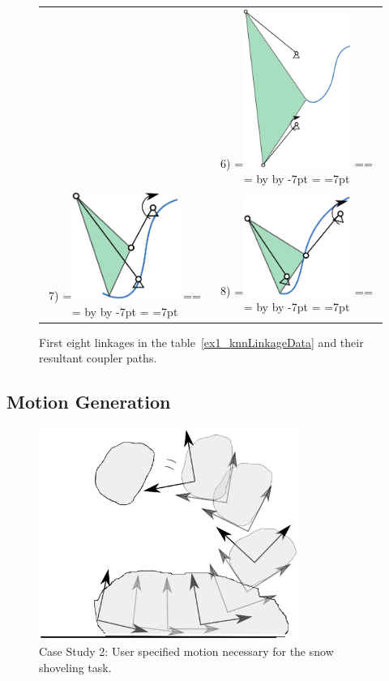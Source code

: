\documentclass[twocolumn,10pt]{asme2ej}
\makeatletter
\newcommand{\putindeepbox}[2][0.7\baselineskip]{{%
    \setbox0=\hbox{#2}%
    \setbox0=\vbox{\noindent\hsize=\wd0\unhbox0}
    \@tempdima=\dp0
    \advance\@tempdima by \ht0
    \advance\@tempdima by -#1\relax
    \dp0=\@tempdima
    \ht0=#1\relax
    \box0
}}
\makeatother
\begin{document}
\begin{figure}
\begin{tabular}{cc}
    & 6)\putindeepbox[7pt]{\includegraphics[width=100pt]{figure/path_solutions/path_sol6.eps}} \\
  7)\putindeepbox[7pt]{\includegraphics[width=100pt]{figure/path_solutions/path_sol7.eps}}
    & 8)\putindeepbox[7pt]{\includegraphics[width=100pt]{figure/path_solutions/path_sol8.eps}}\\
\end{tabular}
\caption{First eight linkages in the table~\ref{ex1_knnLinkageData} and their resultant coupler paths.}
\label{ex1_solns}
\end{figure}

\subsection{Motion Generation}\label{subsec_motiongen}

\begin{figure}
\centering
\includegraphics[width=240pt]{figure/fig_motion_query.eps}
  \caption{Case Study 2: User specified motion necessary for the snow shoveling task.}
\label{motionQuery}
\end{figure}
\end{document}
